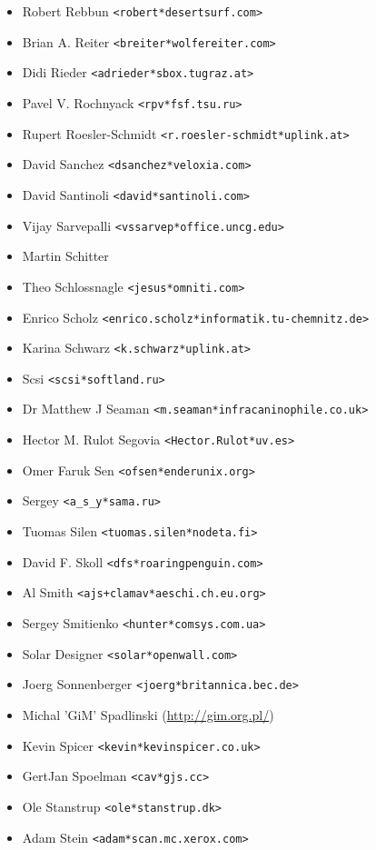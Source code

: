 \documentclass[a4paper,titlepage,12pt]{article}
\newcommand{\email}[1]{\texttt{#1}}
\begin{document}
\begin{itemize}
	\item Robert Rebbun \email{<robert*desertsurf.com>}
	\item Brian A. Reiter \email{<breiter*wolfereiter.com>}
	\item Didi Rieder \email{<adrieder*sbox.tugraz.at>}
	\item Pavel V. Rochnyack \email{<rpv*fsf.tsu.ru>}
	\item Rupert Roesler-Schmidt \email{<r.roesler-schmidt*uplink.at>}
	\item David Sanchez \email{<dsanchez*veloxia.com>}
	\item David Santinoli \email{<david*santinoli.com>}
	\item Vijay Sarvepalli \email{<vssarvep*office.uncg.edu>}
	\item Martin Schitter
	\item Theo Schlossnagle \email{<jesus*omniti.com>}
	\item Enrico Scholz \email{<enrico.scholz*informatik.tu-chemnitz.de>}
	\item Karina Schwarz \email{<k.schwarz*uplink.at>}
	\item Scsi \email{<scsi*softland.ru>}
	\item Dr Matthew J Seaman \email{<m.seaman*infracaninophile.co.uk>}
	\item Hector M. Rulot Segovia \email{<Hector.Rulot*uv.es>}
	\item Omer Faruk Sen \email{<ofsen*enderunix.org>}
	\item Sergey \email{<a\_s\_y*sama.ru>}
	\item Tuomas Silen \email{<tuomas.silen*nodeta.fi>}
	\item David F. Skoll \email{<dfs*roaringpenguin.com>}
	\item Al Smith \email{<ajs+clamav*aeschi.ch.eu.org>}
	\item Sergey Smitienko \email{<hunter*comsys.com.ua>}
	\item Solar Designer \email{<solar*openwall.com>}
	\item Joerg Sonnenberger \email{<joerg*britannica.bec.de>}
	\item Michal 'GiM' Spadlinski (\url{http://gim.org.pl/})
	\item Kevin Spicer \email{<kevin*kevinspicer.co.uk>}
	\item GertJan Spoelman \email{<cav*gjs.cc>}
	\item Ole Stanstrup \email{<ole*stanstrup.dk>}
	\item Adam Stein \email{<adam*scan.mc.xerox.com>}

\end{itemize}
\end{document}
